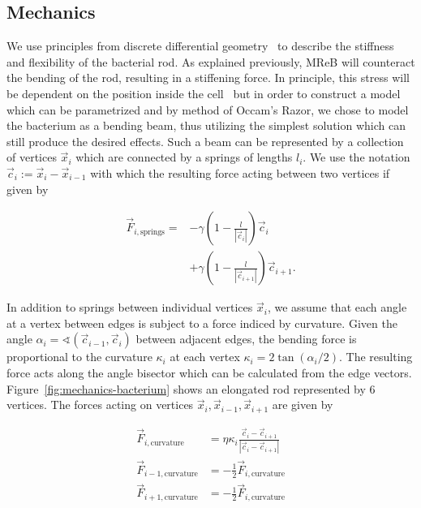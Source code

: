 \documentclass{article}
\begin{document}
\subsection{Mechanics}
\label{subsection:mechanical-model-mechanics}

We use principles from discrete differential geometry~\cite{bobenko2008discrete} to describe the
stiffness and flexibility of the bacterial rod.
As explained previously, MReB will counteract the bending of the rod, resulting in a stiffening
force.
In principle, this stress will be dependent on the position inside the cell~\cite{Chatterjee1988}
but in order to construct a model which can be parametrized and by method of Occam's Razor, we chose
to model the bacterium as a bending beam, thus utilizing the simplest solution which can still
produce the desired effects.
Such a beam can be represented by a collection of vertices $\vec{x}_i$ which are connected by a
springs of lengths $l_i$.
We use the notation $\vec{c}_i:=\vec{x}_i-\vec{x}_{i-1}$ with which the resulting force acting
between two vertices if given by

\begin{align}
    \vec{F}_{i,\text{springs}} =
        &-\gamma\left(1 - \frac{l}{\left|\vec{c}_i\right|}\right)
        \vec{c}_i\\
        &+ \gamma\left(1 - \frac{l}{\left|\vec{c}_{i+1}\right|}\right)
        \vec{c}_{i+1}.
\end{align}

In addition to springs between individual vertices $\vec{x}_i$, we assume that each angle at a
vertex between edges is subject to a force indiced by curvature.
Given the angle $\alpha_i = \sphericalangle(\vec{c}_{i-1},\vec{c}_i)$ between adjacent edges,
the bending force is proportional to the curvature $\kappa_i$ at each vertex
$\kappa_i = 2\tan(\alpha_i/2)$.
The resulting force acts along the angle bisector which can be calculated from the edge vectors.
Figure~\ref{fig:mechanics-bacterium} shows an elongated rod represented by $6$ vertices.
The forces acting on vertices $\vec{x}_i,\vec{x}_{i-1},\vec{x}_{i+1}$ are given by

\begin{align}
    \vec{F}_{i,\text{curvature}} &= \eta\kappa_i
        \frac{\vec{c}_i - \vec{c}_{i+1}}{|\vec{c}_i-\vec{c}_{i+1}|}\\
    \vec{F}_{i-1,\text{curvature}} &= -\frac{1}{2}\vec{F}_{i,\text{curvature}}\\
    \vec{F}_{i+1,\text{curvature}} &= -\frac{1}{2}\vec{F}_{i,\text{curvature}}
\end{align}
\end{document}
